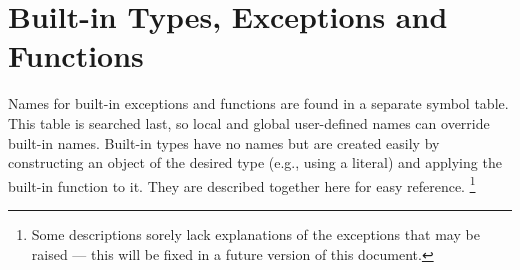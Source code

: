 \chapter{Built-in Types, Exceptions and Functions}


Names for built-in exceptions and functions are found in a separate
symbol table.  This table is searched last, so local and global
user-defined names can override built-in names.  Built-in types have
no names but are created easily by constructing an object of the
desired type (e.g., using a literal) and applying the built-in
function  to it.  They are described together here for
easy reference.%
\footnote{Some descriptions sorely lack explanations of the exceptions
	that may be raised --- this will be fixed in a future version of
	this document.}

